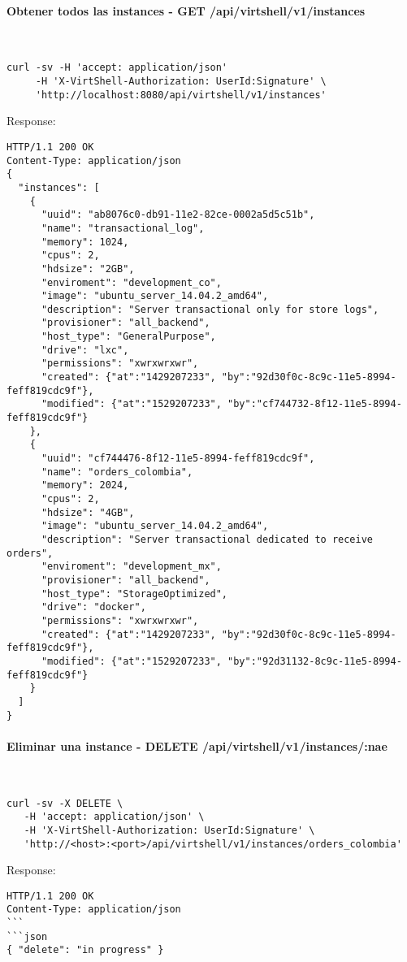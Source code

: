 \paragraph{Obtener todos las instances - GET /api/virtshell/v1/instances} ~\\

\begin{lstlisting}[style=json]
curl -sv -H 'accept: application/json' 
     -H 'X-VirtShell-Authorization: UserId:Signature' \ 
     'http://localhost:8080/api/virtshell/v1/instances'
\end{lstlisting}

Response:

\begin{lstlisting}[style=json]
HTTP/1.1 200 OK
Content-Type: application/json
{
  "instances": [
    {
      "uuid": "ab8076c0-db91-11e2-82ce-0002a5d5c51b",
      "name": "transactional_log",
      "memory": 1024,
      "cpus": 2,
      "hdsize": "2GB",
      "enviroment": "development_co",
      "image": "ubuntu_server_14.04.2_amd64",
      "description": "Server transactional only for store logs", 
      "provisioner": "all_backend",
      "host_type": "GeneralPurpose",
      "drive": "lxc",
      "permissions": "xwrxwrxwr",
      "created": {"at":"1429207233", "by":"92d30f0c-8c9c-11e5-8994-feff819cdc9f"},
      "modified": {"at":"1529207233", "by":"cf744732-8f12-11e5-8994-feff819cdc9f"}
    },
    { 
      "uuid": "cf744476-8f12-11e5-8994-feff819cdc9f",
      "name": "orders_colombia",
      "memory": 2024,
      "cpus": 2,
      "hdsize": "4GB",
      "image": "ubuntu_server_14.04.2_amd64",
      "description": "Server transactional dedicated to receive orders", 
      "enviroment": "development_mx",
      "provisioner": "all_backend",
      "host_type": "StorageOptimized",
      "drive": "docker",
      "permissions": "xwrxwrxwr",
      "created": {"at":"1429207233", "by":"92d30f0c-8c9c-11e5-8994-feff819cdc9f"},
      "modified": {"at":"1529207233", "by":"92d31132-8c9c-11e5-8994-feff819cdc9f"}
    }    
  ]
} 
\end{lstlisting}

\paragraph{Eliminar una instance - DELETE /api/virtshell/v1/instances/:nae} ~\\

\begin{lstlisting}[style=json]
curl -sv -X DELETE \
   -H 'accept: application/json' \
   -H 'X-VirtShell-Authorization: UserId:Signature' \
   'http://<host>:<port>/api/virtshell/v1/instances/orders_colombia'
\end{lstlisting}

Response:

\begin{lstlisting}[style=json]
HTTP/1.1 200 OK
Content-Type: application/json
```
```json
{ "delete": "in progress" }
\end{lstlisting}